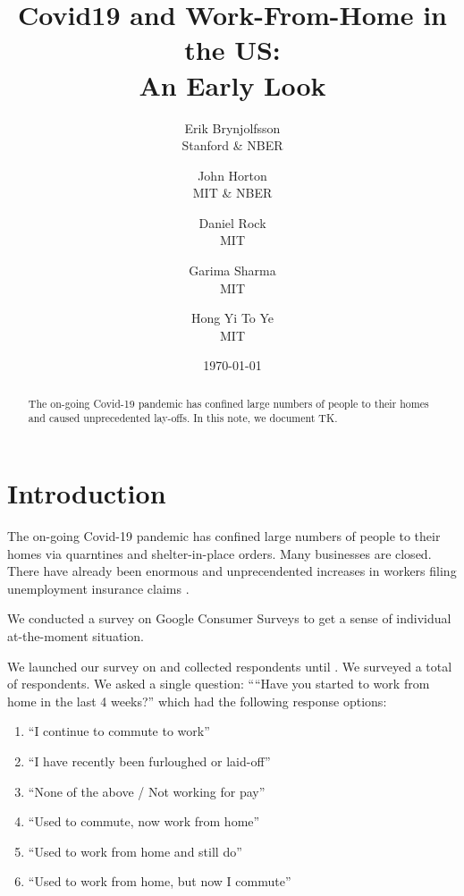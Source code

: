\documentclass[12pt]{article}
\newcommand{\covid}{Covid-19}
\begin{document}
 

\title{Covid19 and Work-From-Home in the US:\\ An Early Look}

\date{\today}

\author{Erik Brynjolfsson\\Stanford \& NBER \and John Horton\\MIT \& NBER \and Daniel Rock\\MIT \and Garima Sharma\\MIT \and Hong Yi To Ye\\MIT}

\maketitle

\begin{abstract}
  \noindent The on-going \covid{} pandemic has confined large numbers of people to their homes and caused unprecedented lay-offs.
  In this note, we document TK. 
  \newline 
\end{abstract} 

\onehalfspacing 

\section{Introduction}
The on-going \covid{} pandemic has confined large numbers of people to their homes via quarntines and shelter-in-place orders.
Many businesses are closed. 
There have already been enormous and unprecendented increases in workers filing unemployment insurance claims \citep{goldsmith2020}. 

We conducted a survey on Google Consumer Surveys to get a sense of individual at-the-moment situation. 

We launched our survey on \SurveyStart{} and collected respondents until \SurveyEnd{}. 
We surveyed a total of \numObs{} respondents.
We asked a single question:
````Have you started to work from home in the last 4 weeks?''
which had the following response options: 

\begin{enumerate} 
\item ``I continue to commute to work''
\item ``I have recently been furloughed or laid-off''
\item ``None of the above / Not working for pay''
\item ``Used to commute, now work from home''   
\item ``Used to work from home and still do''       
\item ``Used to work from home, but now I commute''
\end{enumerate} 
\end{document}
